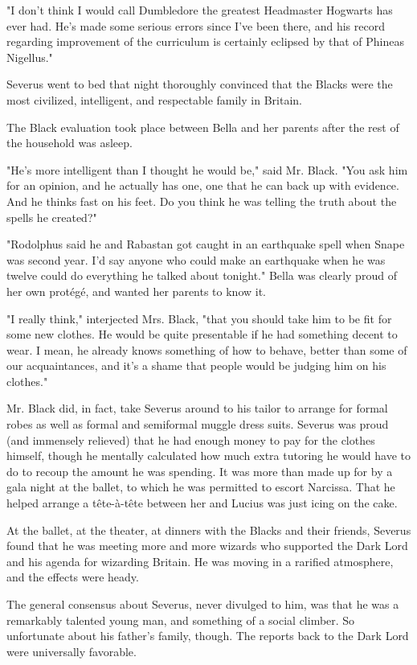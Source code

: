 "I don't think I would call Dumbledore the greatest Headmaster Hogwarts has ever had. He's made some serious errors since I've been there, and his record regarding improvement of the curriculum is certainly eclipsed by that of Phineas Nigellus."

Severus went to bed that night thoroughly convinced that the Blacks were the most civilized, intelligent, and respectable family in Britain.

The Black evaluation took place between Bella and her parents after the rest of the household was asleep.

"He's more intelligent than I thought he would be," said Mr. Black. "You ask him for an opinion, and he actually has one, one that he can back up with evidence. And he thinks fast on his feet. Do you think he was telling the truth about the spells he created?"

"Rodolphus said he and Rabastan got caught in an earthquake spell when Snape was second year. I'd say anyone who could make an earthquake when he was twelve could do everything he talked about tonight." Bella was clearly proud of her own protégé, and wanted her parents to know it.

"I really think," interjected Mrs. Black, "that you should take him to be fit for some new clothes. He would be quite presentable if he had something decent to wear. I mean, he already knows something of how to behave, better than some of our acquaintances, and it's a shame that people would be judging him on his clothes."

Mr. Black did, in fact, take Severus around to his tailor to arrange for formal robes as well as formal and semiformal muggle dress suits. Severus was proud (and immensely relieved) that he had enough money to pay for the clothes himself, though he mentally calculated how much extra tutoring he would have to do to recoup the amount he was spending. It was more than made up for by a gala night at the ballet, to which he was permitted to escort Narcissa. That he helped arrange a tête-à-tête between her and Lucius was just icing on the cake.

At the ballet, at the theater, at dinners with the Blacks and their friends, Severus found that he was meeting more and more wizards who supported the Dark Lord and his agenda for wizarding Britain. He was moving in a rarified atmosphere, and the effects were heady.

The general consensus about Severus, never divulged to him, was that he was a remarkably talented young man, and something of a social climber. So unfortunate about his father's family, though. The reports back to the Dark Lord were universally favorable.

